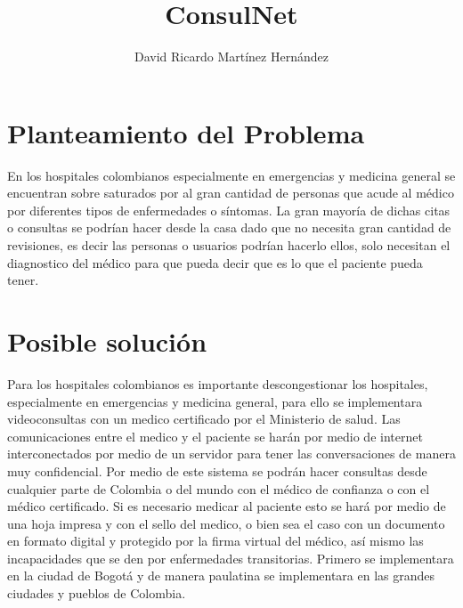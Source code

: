 \documentclass[10pt,graphicx,caption,rotating]{article}
\begin{document}
\title{\Huge \textbf{ConsulNet}}
\author{David Ricardo Martínez Hernández}
\date{}
\maketitle

\section{Planteamiento del Problema}
\noindent
En los hospitales colombianos especialmente en emergencias y medicina general se encuentran sobre saturados por al gran cantidad de personas que acude al médico por diferentes tipos de enfermedades o síntomas. La gran mayoría de dichas citas o consultas se podrían hacer desde la casa dado que no necesita gran cantidad de revisiones, es decir las personas o usuarios podrían hacerlo ellos, solo necesitan el diagnostico del médico para que pueda decir que es lo que el paciente pueda tener.

\section{Posible solución}
\noindent
Para los hospitales colombianos es importante descongestionar los hospitales, especialmente en emergencias y medicina general, para ello se implementara videoconsultas con un medico certificado por el Ministerio de salud. Las comunicaciones entre el medico y el paciente se harán por medio de internet interconectados por medio de un servidor para tener las conversaciones de manera muy confidencial. Por medio de este sistema se podrán hacer consultas desde cualquier parte de Colombia o del mundo con el médico de confianza o con el médico certificado. Si es necesario medicar al paciente esto se hará por medio de una hoja impresa y con el sello del medico, o bien sea el caso con un documento en formato digital y protegido por la firma virtual del médico, así mismo las incapacidades que se den por enfermedades  transitorias. Primero se implementara en la ciudad de Bogotá y de manera paulatina se implementara en las grandes ciudades y pueblos de Colombia.
\end{document}
